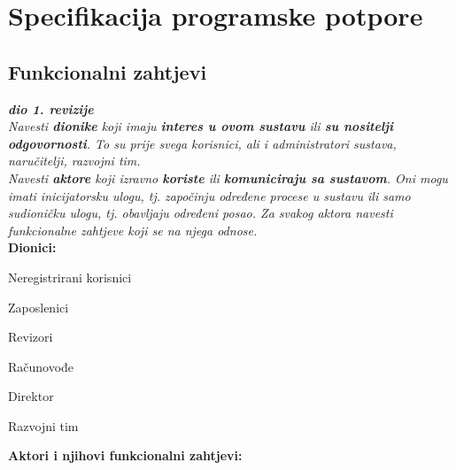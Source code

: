\chapter{Specifikacija programske potpore}
		
	\section{Funkcionalni zahtjevi}
			
			\textbf{\textit{dio 1. revizije}}\\
			
			\textit{Navesti \textbf{dionike} koji imaju \textbf{interes u ovom sustavu} ili  \textbf{su nositelji odgovornosti}. To su prije svega korisnici, ali i administratori sustava, naručitelji, razvojni tim.}\\
				
			\textit{Navesti \textbf{aktore} koji izravno \textbf{koriste} ili \textbf{komuniciraju sa sustavom}. Oni mogu imati inicijatorsku ulogu, tj. započinju određene procese u sustavu ili samo sudioničku ulogu, tj. obavljaju određeni posao. Za svakog aktora navesti funkcionalne zahtjeve koji se na njega odnose.}\\
			
			
			\noindent \textbf{Dionici:}
			
			\begin{packed_enum}
				
				\item Neregistrirani korisnici
				\item Zaposlenici
				\item Revizori	
				\item Računovođe
				\item Direktor
				\item Razvojni tim
				
			\end{packed_enum}
			
			\noindent \textbf{Aktori i njihovi funkcionalni zahtjevi:}
			
